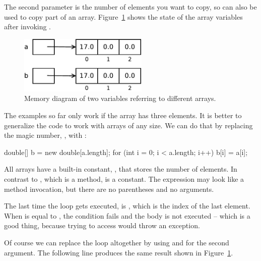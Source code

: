 The second parameter is the number of elements you want to copy, so  can also be used to copy part of an array.
Figure~\ref{fig.array4} shows the state of the array variables after invoking .

\begin{figure}[!ht]
\begin{center}
\includegraphics[width=175pt]{figs/array4.pdf}
\caption{Memory diagram of two variables referring to different arrays.}
\label{fig.array4}
\end{center}
\end{figure}




The examples so far only work if the array has three elements.
It is better to generalize the code to work with arrays of any size.
We can do that by replacing the magic number, , with :

\begin{code}
double[] b = new double[a.length];
for (int i = 0; i < a.length; i++) {
    b[i] = a[i];
}
\end{code}

All arrays have a built-in constant, , that stores the number of elements.
In contrast to , which is a method,  is a constant.
The expression  may look like a method invocation, but there are no parentheses and no arguments.

The last time the loop gets executed,  is , which is the index of the last element.
When  is equal to , the condition fails and the body is not executed -- which is a good thing, because trying to access  would throw an exception.

Of course we can replace the loop altogether by using  and  for the second argument.
The following line produces the same result shown in Figure~\ref{fig.array4}.

